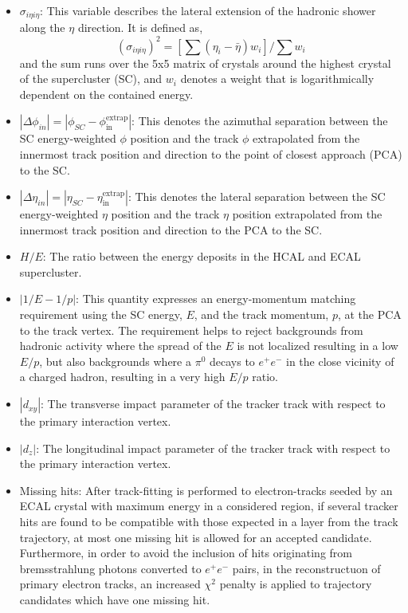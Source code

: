 \begin{itemize}
\item $\sigma_{i\eta i\eta}$: This variable describes the lateral extension of the hadronic shower along the $\eta$ direction. It is defined as,
  \begin{equation}
    (\sigma_{i\eta i\eta})^2 = [\sum{(\eta_i - \bar{\eta})w_i}]/\sum{w_i}
    \label{eq:sigietaieta}
  \end{equation}
  and the sum runs over the 5x5 matrix of crystals around the highest \Et crystal of the supercluster (SC), and $w_i$ denotes a weight that is logarithmically dependent on the contained energy.
\item $|\Delta\phi_{in}| = |\phi_{SC} - \phi^{\mathrm{extrap}}_{\mathrm{in}}|$: This denotes the azimuthal separation between the SC energy-weighted $\phi$ position and the track $\phi$ extrapolated from the innermost track position and direction to the point of closest approach (PCA) to the SC.
\item $|\Delta\eta_{in}| = |\eta_{SC} - \eta^{\mathrm{extrap}}_{\mathrm{in}}|$: This denotes the lateral separation between the SC energy-weighted $\eta$ position and the track $\eta$ position extrapolated from the innermost track position and direction to the PCA to the SC.
\item $H/E$: The ratio between the energy deposits in the HCAL and ECAL supercluster.
\item $|1/E - 1/p|$: This quantity expresses an energy-momentum matching requirement using the SC energy, $E$, and the track momentum, $p$, at the PCA to the track vertex. The requirement helps to reject backgrounds from hadronic activity where the spread of the $E$ is not localized resulting in a low $E/p$, but also backgrounds where a $\pi^0$ decays to $e^{+}e^{-}$ in the close vicinity of a charged hadron, resulting in a very high $E/p$ ratio.  
\item $|{d_{xy}}|$: The transverse impact parameter of the tracker track with respect to the primary interaction vertex.
\item $|{d_{z}}|$: The longitudinal impact parameter of the tracker track with respect to the primary interaction vertex.
\item Missing hits: After track-fitting is performed to electron-tracks seeded by an ECAL crystal with maximum energy in a considered region, if several tracker hits are found to be compatible with those expected in a layer from the track trajectory, at most one missing hit is allowed for an accepted candidate. Furthermore, in order to avoid the inclusion of hits originating from bremsstrahlung photons converted to $e^{+}e^{-}$ pairs, in the reconstructuon of primary electron tracks, an increased $\chi^2$ penalty is applied to trajectory candidates which have one missing hit.

\end{itemize}
